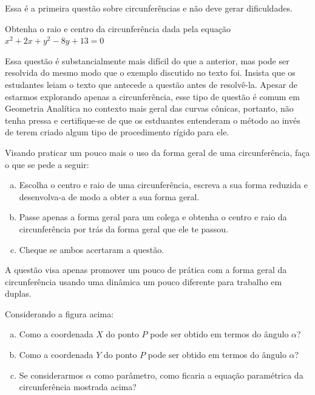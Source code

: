 \documentclass[main_estudante.tex]{subfiles}
\begin{document}
Essa é a primeira questão sobre circunferências e não deve gerar dificuldades.

\begin{questao}
Obtenha o raio e centro da circunferência dada pela equação $x^2+2x+y^2-8y+13=0$
\end{questao}

Essa questão é substancialmente mais difícil do que a anterior, mas pode ser resolvida do mesmo modo que o exemplo discutido no texto foi. Insista que os estudantes leiam o texto que antecede a questão antes de resolvê-la. Apesar de estarmos explorando apenas a circunferência, esse tipo de questão é comum em Geometria Analítica no contexto mais geral das curvas cônicas, portanto, não tenha pressa e certifique-se de que os estduantes entenderam o método ao invés de terem criado algum tipo de procedimento rígido para ele.

\begin{questao}
Visando praticar um pouco mais o uso da forma geral de uma circunferência, faça o que se pede a seguir:
\begin{enumerate}[a)]
\item Escolha o centro e raio de uma circunferência, escreva a sua forma reduzida e desenvolva-a de modo a obter a sua forma geral.
\item Passe apenas a forma geral para um colega e obtenha o centro e raio da circunferência por trás da forma geral que ele te passou.
\item Cheque se ambos acertaram a questão.
\end{enumerate} 
\end{questao}

A questão visa apenas promover um pouco de prática com a forma geral da circunferência usando uma dinâmica um pouco diferente para trabalho em duplas.

\begin{questao}
Considerando a figura acima:
\begin{enumerate}[a)]
\item Como a coordenada $X$ do ponto $P$ pode ser obtido em termos do ângulo $\alpha$?
\item Como a coordenada $Y$ do ponto $P$ pode ser obtido em termos do ângulo $\alpha$?
\item Se considerarmos $\alpha$ como parâmetro, como ficaria a equação paramétrica da circunferência mostrada acima?
\end{enumerate} 
\end{questao}
\end{document}
